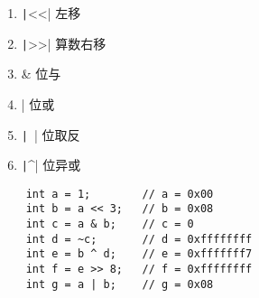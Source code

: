 \begin{enumerate}
    \item \texttt|<<| 左移
    \item \texttt|>>| 算数右移
    \item \& 位与
    \item | 位或
    \item \texttt|~| 位取反
    \item \texttt|^| 位异或
\end{enumerate}

\begin{verbatim}
    int a = 1;        // a = 0x00
    int b = a << 3;   // b = 0x08
    int c = a & b;    // c = 0
    int d = ~c;       // d = 0xffffffff
    int e = b ^ d;    // e = 0xfffffff7
    int f = e >> 8;   // f = 0xffffffff
    int g = a | b;    // g = 0x08
\end{verbatim}

